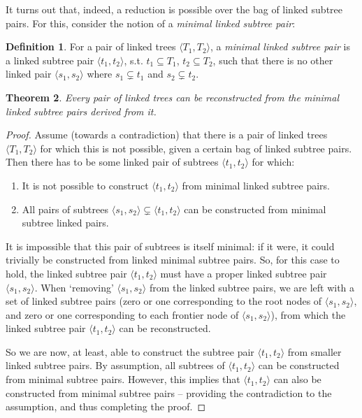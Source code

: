 \documentclass[a4paper]{article}
\newtheorem{theorem}{Theorem}[section]
\theoremstyle{definition}
\newtheorem{definition}[theorem]{Definition}
\begin{document}
It turns out that, indeed, a reduction is possible over the bag of linked
subtree pairs. For this, consider the notion of a \emph{minimal linked subtree
pair}:

\begin{definition}
For a pair of linked trees $\langle T_1, T_2 \rangle$, a \emph{minimal linked
subtree pair} is a linked subtree pair $\langle t_1, t_2 \rangle$, s.t. $t_1
\subseteq T_1$, $t_2 \subseteq T_2$, such that there is no other linked pair
$\langle s_1, s_2 \rangle$ where $s_1 \subsetneq t_1$ and $s_2 \subsetneq t_2$.
\end{definition}

\begin{theorem}
Every pair of linked trees can be reconstructed from the minimal linked subtree
pairs derived from it.
\end{theorem}

\begin{proof}

Assume (towards a contradiction) that there is a pair of linked trees $\langle T_1, T_2 \rangle$ for
which this is not possible, given a certain bag of linked subtree pairs. Then
there has to be some linked pair of subtrees $\langle t_1, t_2 \rangle$ for
which:

\begin{enumerate}
\item It is not possible to construct $\langle t_1, t_2 \rangle$ from minimal
	linked subtree pairs.
\item All pairs of subtrees $\langle s_1, s_2 \rangle \subsetneq \langle t_1,
	t_2 \rangle$ can be constructed from minimal subtree linked pairs.
\end{enumerate}

It is impossible that this pair of subtrees is itself minimal: if it were, it
could trivially be constructed from linked minimal subtree pairs. So, for this
case to hold, the linked subtree pair $\langle t_1, t_2 \rangle$ must have a
proper linked subtree pair $\langle s_1, s_2 \rangle$. When `removing' $\langle
s_1, s_2 \rangle$ from the linked subtree pairs, we are left with a set of linked
subtree pairs (zero or one corresponding to the root nodes of $\langle s_1, s_2
\rangle$, and zero or one corresponding to each frontier node of $\langle s_1, s_2
\rangle$), from which the linked subtree pair $\langle t_1, t_2 \rangle$ can be
reconstructed.

So we are now, at least, able to construct the subtree pair $\langle t_1, t_2
\rangle$ from smaller linked subtree pairs. By assumption, all subtrees of
$\langle t_1, t_2 \rangle$ can be constructed from minimal subtree pairs. However,
this implies that $\langle t_1, t_2 \rangle$ can also be constructed from minimal
subtree pairs -- providing the contradiction to the assumption, and thus completing
the proof.
\end{proof}
\end{document}
